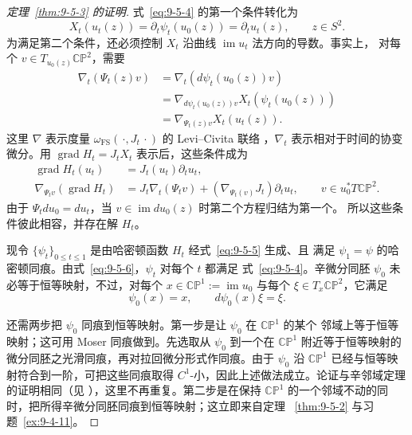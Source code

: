 \begin{proof}[定理~\ref{thm:9-5-3} 的证明]
式~\eqref{eq:9-5-4} 的第一个条件转化为
\[
  X_t(u_t(z))=\partial_t\psi_t(u_0(z))=\partial_tu_t(z),
  \qquad z\in S^2.
\]
为满足第二个条件，还必须控制 $X_t$ 沿曲线 $\operatorname{im}u_t$ 法方向的导数。事实上，
对每个 $v\in T_{u_0(z)}\mathbb{CP}^2$，需要
\[
\begin{aligned}
  \nabla_t(\Psi_t(z)v)
  &=\nabla_t(d\psi_t(u_0(z))v)\\
  &=\nabla_{d\psi_t(u_0(z))v}X_t(\psi_t(u_0(z)))\\
  &=\nabla_{\Psi_t(z)v}X_t(u_t(z)).
\end{aligned}
\]
这里 $\nabla$ 表示度量 $\omega_{\mathrm{FS}}(\,·,J_t\,·)$ 的 Levi--Civita 联络
，$\nabla_t$
表示相对于时间的协变微分。用 $\operatorname{grad}H_t=J_tX_t$ 表示后，这些条件成为
\begin{equation}\label{eq:9-5-6}
  \begin{aligned}
    \operatorname{grad}H_t(u_t)&=J_t(u_t)\partial_tu_t,\\
    \nabla_{\Psi_tv}(\operatorname{grad}H_t)
      &=J_t\nabla_t(\Psi_tv)
        +(\nabla_{\Psi_t(v)}J_t)\partial_tu_t,
        \qquad v\in u_0^*T\mathbb{CP}^2.
  \end{aligned}
\end{equation}
由于 $\Psi_tdu_0=du_t$，当 $v\in\operatorname{im}du_0(z)$ 时第二个方程归结为第一个。
所以这些条件彼此相容，并存在解 $H_t$。

现令 $\{\psi_t\}_{0\le t\le1}$ 是由哈密顿函数 $H_t$ 经式~\eqref{eq:9-5-5} 生成、且
满足 $\psi_1=\psi$ 的哈密顿同痕。由式~\eqref{eq:9-5-6}，$\psi_t$ 对每个 $t$ 都满足
式~\eqref{eq:9-5-4}。辛微分同胚 $\psi_0$ 未必等于恒等映射，不过，对每个
$x\in\mathbb{CP}^1:=\operatorname{im}u_0$ 与每个
$\xi\in T_x\mathbb{CP}^2$，它满足
\[
  \psi_0(x)=x,
  \qquad d\psi_0(x)\xi=\xi.
\]

还需两步把 $\psi_0$ 同痕到恒等映射。第一步是让 $\psi_0$ 在 $\mathbb{CP}^1$ 的某个
邻域上等于恒等映射；这可用 Moser 同痕做到。先选取从 $\psi_0$ 到一个在
$\mathbb{CP}^1$ 附近等于恒等映射的微分同胚之光滑同痕，再对拉回微分形式作同痕。由于
$\psi_0$ 沿 $\mathbb{CP}^1$ 已经与恒等映射符合到一阶，可把这些同痕取得
$C^1$-小，因此上述做法成立。论证与辛邻域定理的证明相同（见
），这里不再重复。第二步是在保持
$\mathbb{CP}^1$ 的一个邻域不动的同时，把所得辛微分同胚同痕到恒等映射；这立即来自定理
~\ref{thm:9-5-2} 与习题~\ref{ex:9-4-11}。


\end{proof}
